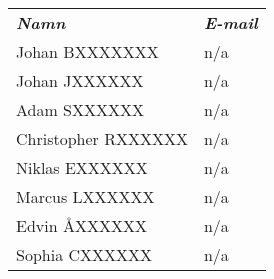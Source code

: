 \small
\hspace*{1em}\begin{tabular}{ l l }
\itshape \textbf{Namn} & \itshape \textbf{E-mail}\\
Johan BXXXXXXX & n/a \\
Johan JXXXXXX & n/a \\
Adam SXXXXXX & n/a \\
Christopher RXXXXXX & n/a \\
Niklas EXXXXXX & n/a \\
Marcus LXXXXXX & n/a \\
Edvin ÅXXXXXX & n/a \\
Sophia CXXXXXX & n/a \\

\end{tabular}\\
\normalsize 